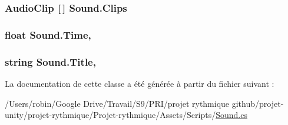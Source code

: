 \subsubsection[{Clips}]{\setlength{\rightskip}{0pt plus 5cm}Audio\+Clip \mbox{[}$\,$\mbox{]} Sound.\+Clips\hspace{0.3cm}{\ttfamily [get]}}\label{class_sound_ada3b25bf02b92b6d0190ad5541b3e4d8}
\hypertarget{class_sound_af23b0067b9f8a8431635e45467a26f47}{}
\subsubsection[{Time}]{\setlength{\rightskip}{0pt plus 5cm}float Sound.\+Time\hspace{0.3cm}{\ttfamily [get]}, {\ttfamily [set]}}\label{class_sound_af23b0067b9f8a8431635e45467a26f47}
\hypertarget{class_sound_a2e949808e2fbfbc883a94e8743d5297b}{}
\subsubsection[{Title}]{\setlength{\rightskip}{0pt plus 5cm}string Sound.\+Title\hspace{0.3cm}{\ttfamily [get]}, {\ttfamily [set]}}\label{class_sound_a2e949808e2fbfbc883a94e8743d5297b}


La documentation de cette classe a été générée à partir du fichier suivant \+:\begin{DoxyCompactItemize}
\item 
/\+Users/robin/\+Google Drive/\+Travail/\+S9/\+P\+R\+I/projet rythmique github/projet-\/unity/projet-\/rythmique/\+Projet-\/rythmique/\+Assets/\+Scripts/\hyperlink{_sound_8cs}{Sound.\+cs}\end{DoxyCompactItemize}
